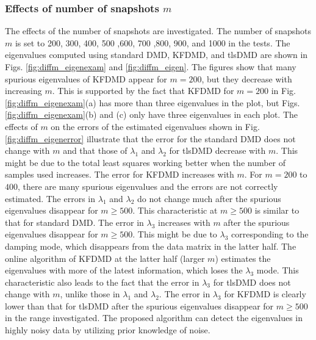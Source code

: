\documentclass[aip,graphicx]{revtex4-1}
\begin{document}
\subsubsection{Effects of number of snapshots $m$}
\label{sec:ENS}
The effects of the number of snapshots are investigated. The number of snapshots $m$ is set to 200, 300, 400, 500 ,600, 700 ,800, 900, and 1000 in the tests. The eigenvalues computed using standard DMD, KFDMD, and tlsDMD are shown in Figs. \ref{fig:diffm_eigenexam} and \ref{fig:diffm_eigen}. The figures show that many spurious eigenvalues of KFDMD appear for $m=200$, but they decrease with increasing $m$. This is supported by the fact that KFDMD for $m=200$ in Fig. \ref{fig:diffm_eigenexam}(a) has more than three eigenvalues in the plot, but Figs.  \ref{fig:diffm_eigenexam}(b) and (c) only have three eigenvalues in each plot.  The effects of $m$ on the errors of the estimated eigenvalues shown in Fig. \ref{fig:diffm_eigenerror} illustrate that the error for the standard DMD does not change with $m$ and that those of $\lambda_1$ and $\lambda_2$ for tlsDMD decrease with $m$. This might be due to the total least squares working better when the number of samples used increases. The error for KFDMD increases with $m$.  For $m=200$ to $400$, there are many spurious eigenvalues and the errors are not correctly estimated. The errors in $\lambda_1$ and $\lambda_2$ do not change much after the spurious eigenvalues disappear for $m \ge 500$. This characteristic at $m \ge 500$ is similar to that for standard DMD. The error in $\lambda_3$ increases with $m$ after the spurious eigenvalues disappear for $m \ge 500$. This might be due to $\lambda_3$ corresponding to the damping mode, which disappears from the data matrix in the latter half. The online algorithm of KFDMD at the latter half (larger $m$) estimates the eigenvalues with more of the latest information, which loses the $\lambda_3$ mode.  This characteristic also leads to the fact that the error in $\lambda_3$ for tlsDMD does not change with $m$, unlike those in $\lambda_1$ and $\lambda_2$. The error in $\lambda_3$ for KFDMD is clearly lower than that for tlsDMD after the spurious eigenvalues disappear for $m \ge 500$ in the range investigated. The proposed algorithm can detect the eigenvalues in highly noisy data by utilizing prior knowledge of noise. 
\end{document}
